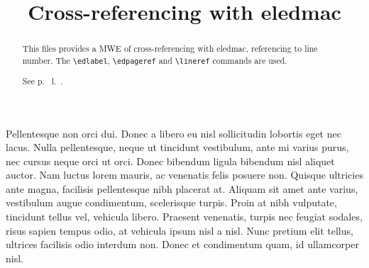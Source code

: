 \documentclass{article}
\begin{document}
\title{Cross-referencing with eledmac}
\maketitle
\begin{abstract}
This files provides a MWE of cross-referencing with eledmac, referencing to line number.
The \verb+\edlabel+, \verb+\edpageref+ and \verb+\lineref+ commands are used.

See p.~ l.~.
\end{abstract}
\beginnumbering

\pstart
Pellentesque non orci dui. Donec a libero eu nisl sollicitudin lobortis eget nec lacus. Nulla pellentesque, neque ut tincidunt vestibulum, ante mi varius purus, nec cursus neque orci ut orci. Donec bibendum ligula bibendum nisl aliquet auctor. Nam luctus lorem mauris, ac venenatis felis posuere non. Quisque ultricies ante magna, facilisis pellentesque nibh placerat at. Aliquam sit amet ante varius, vestibulum augue condimentum, scelerisque turpis. Proin at nibh vulputate, tincidunt tellus vel, vehicula libero. Praesent venenatis, turpis nec feugiat sodales, risus sapien tempus odio, at vehicula ipsum nisl a nisl. Nunc pretium elit tellus, ultrices facilisis odio interdum non. Donec et condimentum quam, id ullamcorper nisl.
\pend
\end{document}
